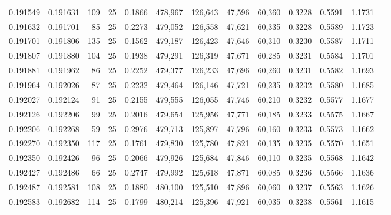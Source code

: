 \begin{tabular}{rrrrrrrrrrrrr}
0.191549 & 0.191631 &   109 &  25 &                                     0.1866 & 478,967 & 126,643 &  47,596 &  60,360 & 0.3228 & 0.5591 & 1.1731 \\
0.191632 & 0.191701 &    85 &  25 &                                     0.2273 & 479,052 & 126,558 &  47,621 &  60,335 & 0.3228 & 0.5589 & 1.1723 \\
0.191701 & 0.191806 &   135 &  25 &                                     0.1562 & 479,187 & 126,423 &  47,646 &  60,310 & 0.3230 & 0.5587 & 1.1711 \\
0.191807 & 0.191880 &   104 &  25 &                                     0.1938 & 479,291 & 126,319 &  47,671 &  60,285 & 0.3231 & 0.5584 & 1.1701 \\
0.191881 & 0.191962 &    86 &  25 &                                     0.2252 & 479,377 & 126,233 &  47,696 &  60,260 & 0.3231 & 0.5582 & 1.1693 \\
0.191964 & 0.192026 &    87 &  25 &                                     0.2232 & 479,464 & 126,146 &  47,721 &  60,235 & 0.3232 & 0.5580 & 1.1685 \\
0.192027 & 0.192124 &    91 &  25 &                                     0.2155 & 479,555 & 126,055 &  47,746 &  60,210 & 0.3232 & 0.5577 & 1.1677 \\
0.192126 & 0.192206 &    99 &  25 &                                     0.2016 & 479,654 & 125,956 &  47,771 &  60,185 & 0.3233 & 0.5575 & 1.1667 \\
0.192206 & 0.192268 &    59 &  25 &                                     0.2976 & 479,713 & 125,897 &  47,796 &  60,160 & 0.3233 & 0.5573 & 1.1662 \\
0.192270 & 0.192350 &   117 &  25 &                                     0.1761 & 479,830 & 125,780 &  47,821 &  60,135 & 0.3235 & 0.5570 & 1.1651 \\
0.192350 & 0.192426 &    96 &  25 &                                     0.2066 & 479,926 & 125,684 &  47,846 &  60,110 & 0.3235 & 0.5568 & 1.1642 \\
0.192427 & 0.192486 &    66 &  25 &                                     0.2747 & 479,992 & 125,618 &  47,871 &  60,085 & 0.3236 & 0.5566 & 1.1636 \\
0.192487 & 0.192581 &   108 &  25 &                                     0.1880 & 480,100 & 125,510 &  47,896 &  60,060 & 0.3237 & 0.5563 & 1.1626 \\
0.192583 & 0.192682 &   114 &  25 &                                     0.1799 & 480,214 & 125,396 &  47,921 &  60,035 & 0.3238 & 0.5561 & 1.1615 \\

\end{tabular}
